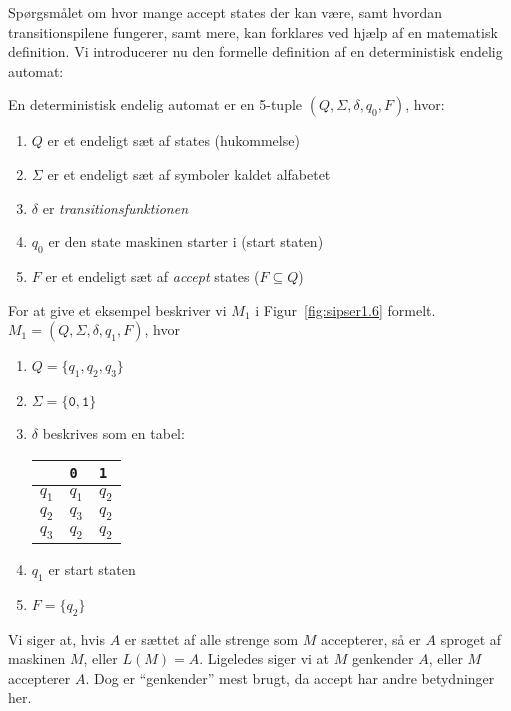 Spørgsmålet om hvor mange accept states der kan være, samt hvordan transitionspilene fungerer, samt mere, kan forklares ved hjælp af en matematisk definition. Vi introducerer nu den formelle definition af en deterministisk endelig automat:

\begin{definition}
	En deterministisk endelig automat er en 5-tuple $(Q, \Sigma, \delta, q_{0}, F)$, hvor:
	\begin{enumerate}
		\item $Q$ er et endeligt sæt af states (hukommelse)
		\item $\Sigma$ er et endeligt sæt af symboler kaldet alfabetet
		\item $\delta$ er \textit{transitionsfunktionen}
		\item $q_{0}$ er den state maskinen starter i (start staten)
		\item $F$ er et endeligt sæt af \textit{accept} states ($F \subseteq Q$)
	\end{enumerate}
\end{definition}

For at give et eksempel beskriver vi $M_{1}$ i Figur~\ref{fig:sipser1.6} formelt.\\
$M_{1} = (Q, \Sigma, \delta, q_{1}, F)$, hvor
\begin{enumerate}
	\item $Q = \{q_{1}, q_{2}, q_{3}\}$
	\item $\Sigma = \{\mathtt{0,1}\}$
	\item $\delta$ beskrives som en tabel:
	      \begin{table}[h]
		      \centering
		      \begin{tabular}{l|ll}
			            & \texttt{0} & \texttt{1} \\ \hline
			      $q_1$ & $q_1$      & $q_2$      \\
			      $q_2$ & $q_3$      & $q_2$      \\
			      $q_3$ & $q_2$      & $q_2$
		      \end{tabular}
	      \end{table}
	\item $q_{1}$ er start staten
	\item $F = \{q_{2}\}$
\end{enumerate}

Vi siger at, hvis $A$ er sættet af alle strenge som $M$ accepterer, så er $A$ sproget af maskinen $M$, eller $L(M) = A$. Ligeledes siger vi at $M$ genkender $A$, eller $M$ accepterer $A$. Dog er ``genkender'' mest brugt, da accept har andre betydninger her.

